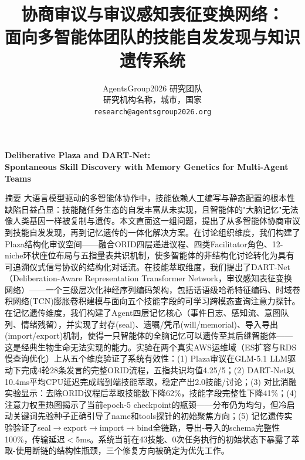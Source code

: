 \documentclass[twocolumn,10.5pt]{ctexart}
\begin{document}
\title{\heiti 协商审议与审议感知表征变换网络：\\面向多智能体团队的技能自发发现与知识遗传系统}
\author{
   AgentsGroup2026 研究团队 \\[4pt]
   研究机构名称，城市，国家 \\[2pt]
   \texttt{research@agentsgroup2026.org}
}
\date{}
\maketitle

\begin{center}
  {\bfseries Deliberative Plaza and DART-Net:\\
  Spontaneous Skill Discovery with Memory Genetics for Multi-Agent Teams}
\end{center}

{\heiti 摘要 \quad}
{\kaishu
大语言模型驱动的多智能体协作中，技能依赖人工编写与静态配置的根本性缺陷日益凸显：技能随任务生态的自发丰富从未实现，且智能体的"大脑记忆"无法像人类基因一样被复制与遗传。本文直面这一组问题，提出了从多智能体协商审议到技能自发发现，再到记忆遗传的一体化解决方案。在讨论组织维度，我们构建了Plaza结构化审议空间——融合ORID四层递进议程、四类Facilitator角色、12-niche环状座位布局与五指量表共识机制，使多智能体的非结构化讨论转化为具有可追溯仪式信号协议的结构化对话流。在技能萃取维度，我们提出了DART-Net（Deliberation-Aware Representation Transformer Network，审议感知表征变换网络）——一个三级层次化神经序列编码架构，包括话语级哈希特征编码、时域卷积网络(TCN)膨胀卷积建模与面向五个技能字段的可学习跨模态查询注意力探针。在记忆遗传维度，我们构建了Agent四层记忆核心（事件日志、感知流、意图队列、情绪残留），并实现了封存(seal)、遗嘱/凭吊(will/memorial)、导入导出(import/export)机制，使得一只智能体的全脑记忆可以遗传至其后继智能体——这是经典生物生命无法实现的能力。实验在两个真实AWS运维域（ES扩容与RDS慢查询优化）上从五个维度验证了系统有效性：(1) Plaza审议在GLM-5.1 LLM驱动下完成4轮28条发言的完整ORID流程，五指共识均值4.25/5；(2) DART-Net以10.4ms平均CPU延迟完成端到端技能萃取，稳定产出2.0技能/讨论；(3) 对比消融实验显示：去除ORID议程后萃取技能数下降62\%，技能字段完整性下降41\%；(4) 注意力权重热图揭示了当前epoch-5 checkpoint的瓶颈——分布仍为均匀，但冷启动关键词先验种子正确引导了name和tools探针的初始聚焦方向；(5) 记忆遗传实验验证了seal$\rightarrow$export$\rightarrow$import$\rightarrow$bind全链路，导出-导入的schema完整性100\%，传输延迟$<$5ms。系统当前在43技能、0次任务执行的初始状态下暴露了萃取-使用断链的结构性瓶颈，三个修复方向被确定为优先工作。
}
\end{document}
